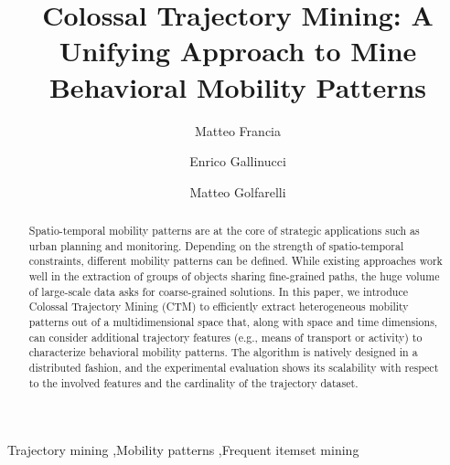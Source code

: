 \documentclass[preprint,12pt,authoryear]{elsarticle} %
\begin{document}
\begin{frontmatter}
\author{Matteo Francia}
\author{Enrico Gallinucci}
\author{Matteo Golfarelli}
\address{DISI -- University of Bologna, Cesena, Italy}
            
\title{Colossal Trajectory Mining: A Unifying Approach to Mine Behavioral Mobility Patterns}

\begin{abstract}
Spatio-temporal mobility patterns are at the core of strategic applications such as urban planning and monitoring.
Depending on the strength of spatio-temporal constraints, different mobility patterns can be defined. 
While existing approaches work well in the extraction of groups of objects sharing fine-grained paths, the huge volume of large-scale data asks for coarse-grained solutions.
In this paper, we introduce Colossal Trajectory Mining (CTM) to efficiently extract heterogeneous mobility patterns out of a multidimensional space that, along with space and time dimensions, can consider additional trajectory features (e.g., means of transport or activity) to characterize behavioral mobility patterns. 
The algorithm is natively designed in a distributed fashion, and the experimental evaluation shows its scalability with respect to the involved features and the cardinality of the trajectory dataset.
\end{abstract}

\begin{keyword}
Trajectory mining \sep Mobility patterns \sep Frequent itemset mining
\end{keyword}
\end{frontmatter}

\sloppy
\end{document}
